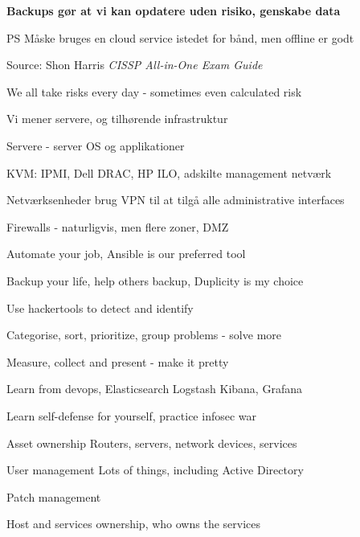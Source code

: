 \documentclass[20pt,landscape,a4paper,footrule]{foils}
\begin{document}
\vskip 5mm

\centerline{\bf Backups gør at vi kan opdatere uden risiko, genskabe data}

\vskip 5mm

PS Måske bruges en cloud service istedet for bånd, men offline er godt



Source: Shon Harris \emph{CISSP All-in-One Exam Guide}

\vskip 2cm
\centerline{We all take risks every day - sometimes even calculated risk}


\begin{list1}
\item Vi mener servere, og tilhørende infrastruktur
\item Servere - server OS og applikationer
\item KVM: IPMI, Dell DRAC, HP ILO, adskilte management netværk
\item Netværksenheder brug VPN til at tilgå alle administrative interfaces
\item Firewalls - naturligvis, men flere zoner, DMZ
\end{list1}


\begin{list1}
\item Automate your job, Ansible is our preferred tool
\item Backup your life, help others backup, Duplicity is my choice
\item Use hackertools to detect and identify
\item Categorise, sort, prioritize, group problems - solve more
\item Measure, collect and present - make it pretty
\item Learn from devops, Elasticsearch Logstash Kibana, Grafana
\item {} Learn self-defense for yourself, practice infosec war
\end{list1}



\begin{list1}
\item Asset ownership
Routers, servers, network devices, services
\item User management
Lots of things, including Active Directory
\item Patch management
\item Host and services ownership, who owns the services
\end{list1}
\end{document}
